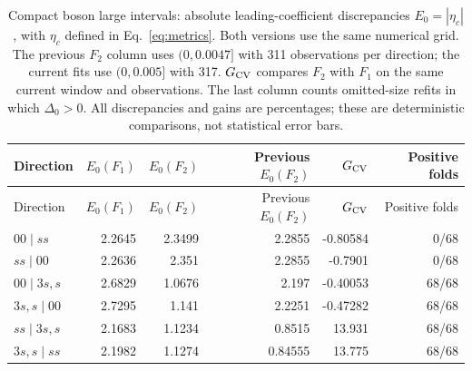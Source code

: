 \begingroup\setlength{\tabcolsep}{3pt}
\begin{longtable}{lrrrrr}
\caption{Compact boson large intervals: absolute leading-coefficient discrepancies $E_0=|\eta_c|$, with $\eta_c$ defined in Eq.~\eqref{eq:metrics}. Both versions use the same numerical grid. The previous $F_2$ column uses $(0,0.0047]$ with 311 observations per direction; the current fits use $(0,0.005]$ with 317. $G_{\rm CV}$ compares $F_2$ with $F_1$ on the same current window and observations. The last column counts omitted-size refits in which $\Delta_0>0$. All discrepancies and gains are percentages; these are deterministic comparisons, not statistical error bars.}
\label{tab:common-large-boson}\\\toprule
Direction & $E_0(F_1)$ & $E_0(F_2)$ & Previous $E_0(F_2)$ & $G_{\rm CV}$ & Positive folds\\\midrule
\endfirsthead
\toprule
Direction & $E_0(F_1)$ & $E_0(F_2)$ & Previous $E_0(F_2)$ & $G_{\rm CV}$ & Positive folds\\\midrule
\endhead
\bottomrule\endfoot
$00\mid ss$ & 2.2645 & 2.3499 & 2.2855 & -0.80584 & 0/68\\
$ss\mid 00$ & 2.2636 & 2.351 & 2.2855 & -0.7901 & 0/68\\
$00\mid 3s,s$ & 2.6829 & 1.0676 & 2.197 & -0.40053 & 68/68\\
$3s,s\mid 00$ & 2.7295 & 1.141 & 2.2251 & -0.47282 & 68/68\\
$ss\mid 3s,s$ & 2.1683 & 1.1234 & 0.8515 & 13.931 & 68/68\\
$3s,s\mid ss$ & 2.1982 & 1.1274 & 0.84555 & 13.775 & 68/68\\
\end{longtable}
\endgroup
